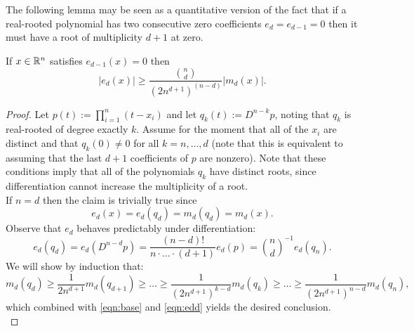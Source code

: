 The following lemma may be seen as a quantitative version of the fact that if a real-rooted polynomial
has two consecutive zero coefficients $e_d=e_{d-1}=0$ then it must have a root of multiplicity $d+1$ at zero.
\begin{lemma}\label{lem:edmd} If $x\in\mathbb{R}^n$ satisfies $e_{d-1}(x)=0$ then
	$$ |e_d(x)|\ge \frac{\binom{n}{d}}{(2n^{d+1})^{(n-d)}}|m_d(x)|.$$
\end{lemma}
\begin{proof}

Let $p(t):=\prod_{i=1}^n(t-x_i)$ and let $q_k(t):=D^{n-k}p$, noting that $q_k$
is real-rooted of degree exactly $k$. Assume for the moment that all of the
$x_i$ are distinct and that $q_k(0)\neq 0$ for all $k=n,\ldots,d$ (note
that this is equivalent to assuming that the last $d+1$ coefficients of
$p$ are nonzero). Note that these conditions imply that all of the polynomials $q_k$ have distinct
roots, since differentiation cannot increase the multiplicity of a root.\\

If $n=d$ then the claim is trivially true since 
	\begin{equation}\label{eqn:base} e_d(x)=e_d(q_d)=m_d(q_d)=m_d(x).\end{equation}
Observe that $e_d$ behaves predictably under differentiation:
	\begin{equation}\label{eqn:edd} e_d(q_d)=e_d(D^{n-d}p)=\frac{(n-d)!}{n\cdot\ldots\cdot (d+1)}e_d(p)=\binom{n}{d}^{-1}e_d(q_n).\end{equation}
We will show by induction that:
	$$ m_d(q_{d})\ge \frac{1}{2n^{d+1}}m_d(q_{d+1})\ge\ldots \ge \frac{1}{(2n^{d+1})^{k-d}}m_d(q_k)\ge\ldots\ge \frac{1}{(2n^{d+1})^{n-d}}m_d(q_{n}),$$
	which combined with \eqref{eqn:base} and \eqref{eqn:edd} yields the desired conclusion.\\



\end{proof}
